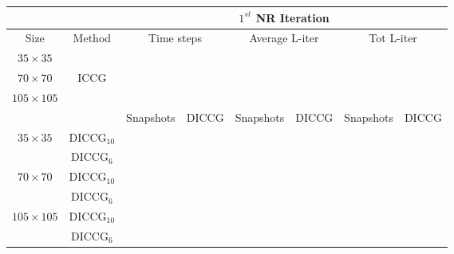 \documentclass[a4paper,10pt]{article}
\title{}
\author{}
\begin{document}
\begin{table}[!ht]\centering
\begin{minipage}{1\textwidth}
\vspace{-10pt}
\centering
\begin{tabular}{ |c|c|c|c|c|c|c|c|} 
  \hline
 & & \multicolumn{6}{|c|}{$1^{st}$ NR Iteration}  \\
\hline
Size&Method&  \multicolumn{2}{|c|}{Time steps} &\multicolumn{2}{|c|}{Average L-iter} & \multicolumn{2}{|c|}{Tot L-iter}\\
\hline
$35\times35$& &\multicolumn{2}{|c|}{} & \multicolumn{2}{|c|}{}& \multicolumn{2}{|c|}{} \\

$70\times70$&ICCG&\multicolumn{2}{|c|}{}& \multicolumn{2}{|c|}{}& \multicolumn{2}{|c|}{}\\

$105\times105$& & \multicolumn{2}{|c|}{} &\multicolumn{2}{|c|}{} & \multicolumn{2}{|c|}{}\\
\hline
&&Snapshots&DICCG&Snapshots&DICCG&Snapshots&DICCG\\
\hline
$35\times35$&DICCG$_{10}$&&&&&& \\
&DICCG$_6$&&&&&& \\
\hline
$70\times70$&DICCG$_{10}$ && &&&& \\
&DICCG$_6$ &&&& &&\\
\hline
$105\times105$&DICCG$_{10}$ && && && \\
&DICCG$_6$&& && && \\
\hline
 \end{tabular}
\end{minipage}
\end{table}
\end{document}
